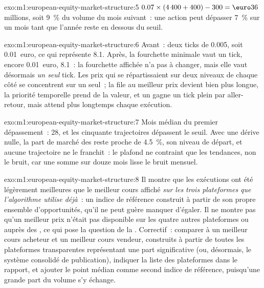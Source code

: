\begin{solution}{exo:m1:european-equity-market-structure:5}
$0.07 \times (4\,400 + 400) - 300 = \text{\euro}36$ millions, soit 9~\%
du volume du mois suivant~: une action peut dépasser 7~\% sur un mois tant que l'année
reste en dessous du seuil.
\end{solution}

\begin{solution}{exo:m1:european-equity-market-structure:6}
Avant~: deux ticks de 0.005, soit 0.01~euro, ce qui représente \qty{8.1}{\bp}. Après, la
fourchette minimale vaut un tick, encore 0.01~euro, \qty{8.1}{\bp}~: la
fourchette affichée n'a pas à changer, mais elle vaut désormais \emph{un seul} tick. Les prix qui
se répartissaient sur deux niveaux de chaque côté se concentrent sur un seul~; la file au meilleur prix
devient bien plus longue, la priorité temporelle prend de la valeur, et un 
gagne un tick plein par aller-retour, mais attend plus longtemps chaque exécution.
\end{solution}

\begin{solution}{exo:m1:european-equity-market-structure:7}
Mois médian du premier dépassement~: 28, et les cinquante trajectoires dépassent le seuil. Avec une
dérive nulle, la part de marché des  reste proche de 4.5~\%, son niveau de départ, et aucune
trajectoire ne le franchit~: le plafond ne contraint que les tendances, non le bruit, car une somme
sur douze mois lisse le bruit mensuel.
\end{solution}

\begin{solution}{exo:m1:european-equity-market-structure:8}
Il montre que les exécutions ont été légèrement meilleures que le meilleur cours affiché \emph{sur les
trois plateformes que l'algorithme utilise déjà}~: un indice de référence construit à partir de son propre
ensemble d'opportunités, qu'il ne peut guère manquer d'égaler. Il ne montre pas qu'un
meilleur prix n'était pas disponible sur les quatre autres plateformes ou auprès des
, ce qui pose la question de la . Correctif~: comparer
à un meilleur cours acheteur et un meilleur cours vendeur, construits à partir de toutes les plateformes transparentes
représentant une part significative (ou, désormais, le système consolidé de publication), indiquer la liste des plateformes dans le rapport, et
ajouter le point médian comme second indice de référence, puisqu'une grande part du volume
s'y échange.
\end{solution}

